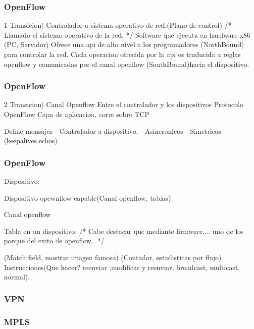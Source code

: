 \documentclass{beamer}
\begin{document}
\begin{frame}
\frametitle{OpenFlow} 
1 Transicion) Controlador o sistema operativo de red.(Plano de control) 
/*
Llamado el sistema operativo de la red, 
*/
Software que ejecuta en hardware x86 (PC, Servidor)
Ofrece una api de alto nivel a los programadores (NorthBound) para controlar la red.
Cada operacion ofrecida por la api es traducida a reglas openflow y comunicadas por el canal openflow (SouthBound)hacia el dispositivo.
\end{frame}

\begin{frame}
\frametitle{OpenFlow} 

2 Transicion) Canal Openflow 
Entre el controlador y los dispositivos
Protocolo OpenFlow
Capa de aplicacion, corre sobre TCP

Define mensajes
- Controlador a dispositivo. 
- Asincronicos
- Simetricos (keepalives,echos)

\end{frame}

\begin{frame}
\frametitle{OpenFlow} 
Dispositivo:

Dispositivo opewnflow-capable(Canal openflow, tablas)


Canal openflow

Tabla en un dispositivo:    
/*
Cabe destacar que mediante firmware.... uno de los porque del exito de openflow..
*/

(Match field, mostrar imagen famosa)
(Contador, estadisticas por flujo)
Instrucciones(Que hacer? reenviar ,modificar y reenviar, broadcast, multicast, normal).
\end{frame}

\begin{frame}
\frametitle{VPN} 

\end{frame}

\begin{frame}
\frametitle{MPLS} 

\end{frame}
\end{document}
